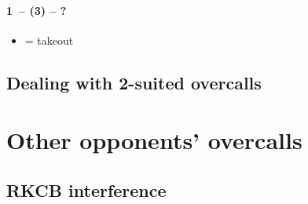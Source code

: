 \documentclass[12pt, a4paper]{report}
\begin{document}
{{{            \subsubsection*{1\ntx\ -- (3\spades) -- ?}
            \begin{itemize}
                \item \dbl = takeout \gf
            \end{itemize}

        }

        \section*{\colorbox{blue!30}{Dealing with 2-suited overcalls}}
         {

        }

    }

    \chapter*{\colorbox{Plum!30}{Other opponents' overcalls}}
     {

        \section*{\colorbox{blue!30}{RKCB interference}}
         {

        }

    }

}
\end{document}
